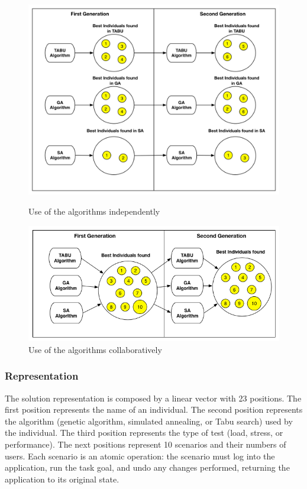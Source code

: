 \begin{figure}[h]
\begin{minipage}{.5\textwidth}
\centering
\includegraphics[width=1\textwidth]{./images/independ.png}
\caption{Use of the algorithms independently \cite{Gois2016}}
\label{fig:firstaproach}
\end{minipage}
\begin{minipage}{.5\textwidth}
\centering
\includegraphics[width=1\textwidth]{./images/collaborative.png}
\caption{Use of the  algorithms collaboratively \cite{Gois2016}}
\label{fig:secondapproach}
\end{minipage}
\end{figure}

\subsubsection{Representation}

The solution representation is composed by a linear vector with 23 positions. The first position represents the name of an individual. The second position represents the algorithm (genetic algorithm, simulated annealing, or Tabu search) used by the individual. The third position represents the type of test (load, stress, or performance). The next positions represent 10 scenarios and their numbers of users. Each scenario is an atomic operation: the scenario must log into the application, run the task goal, and undo any changes performed, returning the application to its original state.


